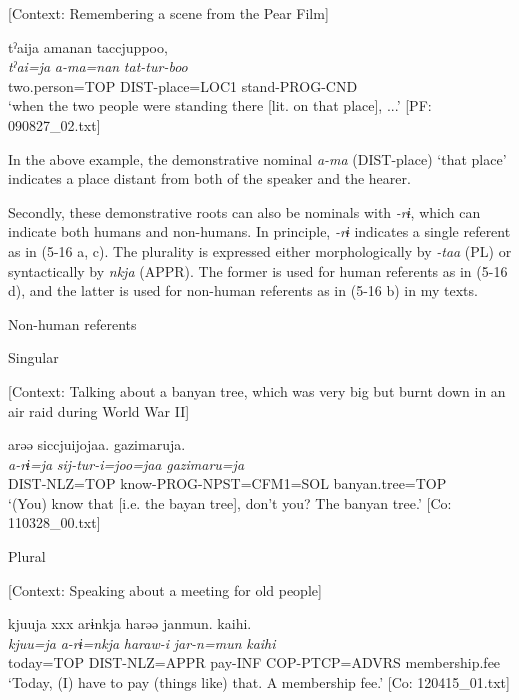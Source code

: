 \ea \label{ex:5:15}   [Context: Remembering a scene from the Pear Film]

\glll  tˀaija  amanan  taccjuppoo,\\
\textit{tˀai=ja}  \textit{a-ma=nan}  \textit{tat-tur-boo}\\
two.person=TOP  DIST-place=LOC1  stand-PROG-CND\\
\glt ‘when the two people were standing there [lit. on that place], ...’ [PF: 090827\_02.txt]
\z

In the above example, the demonstrative nominal \textit{a-ma} (DIST-place) ‘that place’ indicates a place distant from both of the speaker and the hearer.

Secondly, these demonstrative roots can also be nominals with \textit{{}-rɨ}, which can indicate both humans and non-humans. In principle, \textit{{}-rɨ} indicates a single referent as in (5-16 a, c). The plurality is expressed either morphologically by \textit{{}-taa} (PL) or syntactically by \textit{nkja} (APPR). The former is used for human referents as in (5-16 d), and the latter is used for non-human referents as in (5-16 b) in my texts.

\ea \label{ex:5:16}   Non-human referents

 \ea \label{ex:5:16a} Singular

    [Context: Talking about a banyan tree, which was very big but burnt down in an air raid during World War II]

\glll  arəə  siccjuijojaa.  gazimaruja.\\
\textit{a-rɨ=ja}  \textit{sij-tur-i=joo=jaa}  \textit{gazimaru=ja}\\
DIST-NLZ=TOP  know-PROG-NPST=CFM1=SOL  banyan.tree=TOP\\
\glt ‘(You) know that [i.e. the bayan tree], don’t you? The banyan tree.’ [Co: 110328\_00.txt]

 \ex \label{ex:5:b} Plural

    [Context: Speaking about a meeting for old people]

\glll  kjuuja  xxx  arɨnkja  harəə  janmun.   {\textbar}kaihi{\textbar}.\\
\textit{kjuu=ja}    \textit{a-rɨ=nkja}  \textit{haraw-i}  \textit{jar-n=mun}   \textit{kaihi}\\
today=TOP    DIST-NLZ=APPR  pay-INF  COP-PTCP=ADVRS   membership.fee\\
\glt ‘Today, (I) have to pay (things like) that. A membership fee.’ [Co: 120415\_01.txt]

